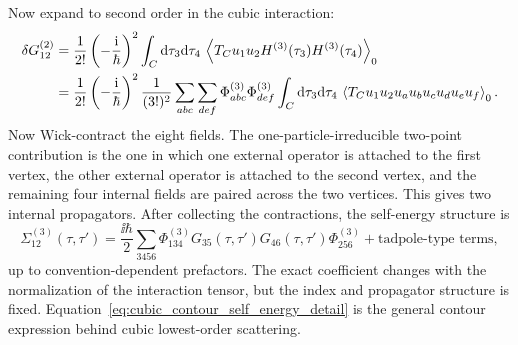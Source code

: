 Now expand to second order in the cubic interaction:
\begin{align}
    \delta G^{(2)}_{12}
    &=
    \frac{1}{2!}\left( -\frac{\mathrm{i}}{\hbar} \right)^2
    \int_C \mathrm{d}\tau_3\mathrm{d}\tau_4\,
    \left\langle T_C u_1 u_2 H^{(3)}(\tau_3)H^{(3)}(\tau_4) \right\rangle_0 \\
    &=
    \frac{1}{2!}\left( -\frac{\mathrm{i}}{\hbar} \right)^2
    \frac{1}{(3!)^2}
    \sum_{abc}\sum_{def}
    \Phi^{(3)}_{abc}\Phi^{(3)}_{def}
    \int_C \mathrm{d}\tau_3\mathrm{d}\tau_4\,
    \left\langle T_C u_1 u_2 u_a u_b u_c u_d u_e u_f \right\rangle_0.
    \label{eq:second_order_cubic_green_correction}
\end{align}
Now Wick-contract the eight fields. The one-particle-irreducible two-point contribution is the one in which one external operator is attached to the first vertex, the other external operator is attached to the second vertex, and the remaining four internal fields are paired across the two vertices. This gives two internal propagators. After collecting the contractions, the self-energy structure is
\begin{equation}
    \Sigma^{(3)}_{12}(\tau,\tau')
    =
    \frac{\ii\hbar}{2}
    \sum_{3456}
    \Phi^{(3)}_{134}
    G_{35}(\tau,\tau')
    G_{46}(\tau,\tau')
    \Phi^{(3)}_{256}
    + \text{tadpole-type terms},
    \label{eq:cubic_contour_self_energy_detail}
\end{equation}
up to convention-dependent prefactors. The exact coefficient changes with the normalization of the interaction tensor, but the index and propagator structure is fixed. Equation~\eqref{eq:cubic_contour_self_energy_detail} is the general contour expression behind cubic lowest-order scattering.

